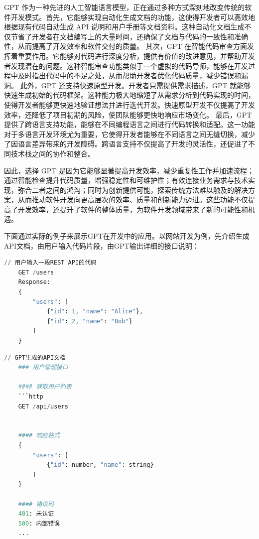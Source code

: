 GPT 作为一种先进的人工智能语言模型，正在通过多种方式深刻地改变传统的软件开发模式。首先，它能够实现自动化生成文档的功能，这使得开发者可以高效地根据现有代码自动生成 API 说明和用户手册等文档资料。这种自动化文档生成不仅节省了开发者在文档编写上的大量时间，还确保了文档与代码的一致性和准确性，从而提高了开发效率和软件交付的质量。
其次，GPT 在智能代码审查方面发挥着重要作用。它能够对代码进行深度分析，提供有价值的改进意见，并帮助开发者发现潜在的问题。这种智能审查功能类似于一个虚拟的代码导师，能够在开发过程中及时指出代码中的不足之处，从而帮助开发者优化代码质量，减少错误和漏洞。
此外，GPT 还支持快速原型开发。开发者只需提供需求描述，GPT 就能够快速生成初始的代码框架。这种能力极大地缩短了从需求分析到代码实现的时间，使得开发者能够更快速地验证想法并进行迭代开发。快速原型开发不仅提高了开发效率，还降低了项目初期的风险，使团队能够更快地响应市场变化。
最后，GPT 提供了跨语言支持功能，能够在不同编程语言之间进行代码转换和适配。这一功能对于多语言开发环境尤为重要，它使得开发者能够在不同语言之间无缝切换，减少了因语言差异带来的开发障碍。跨语言支持不仅提高了开发的灵活性，还促进了不同技术栈之间的协作和整合。

因此，选择 GPT 是因为它能够显著提高开发效率，减少重复性工作并加速流程；通过智能检查提升代码质量，增强稳定性和可维护性；有效连接业务需求与技术实现，弥合二者之间的鸿沟；同时为创新提供可能，探索传统方法难以触及的解决方案，从而推动软件开发向更高层次的效率、质量和创新能力迈进。这些功能不仅提高了开发效率，还提升了软件的整体质量，为软件开发领域带来了新的可能性和机遇。

下面通过实际的例子来展示GPT在开发中的应用。以网站开发为例，先介绍生成API文档，由用户输入代码片段，由GPT输出详细的接口说明：

\begin{promptbox}
\small{
\begin{lstlisting}[language=Python]
    // 用户输入一段REST API的代码
    GET /users
    Response:
    {
        "users": [
            {"id": 1, "name": "Alice"},
            {"id": 2, "name": "Bob"}
        ]
    }
\end{lstlisting}}
\end{promptbox}

\begin{gptbox}
\small{
\begin{lstlisting}[language=Python]
    // GPT生成的API文档
    ### 用户管理接口
    
    #### 获取用户列表
    ```http
    GET /api/users
    
    
    #### 响应格式
    {
        "users": [
            {"id": number, "name": string}
        ]
    }

    #### 错误码
    401: 未认证
    500: 内部错误
    ...
\end{lstlisting}
}
\end{gptbox}


